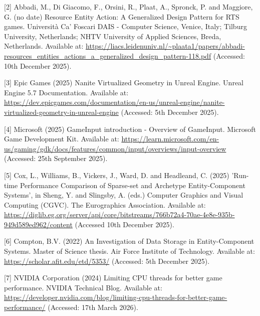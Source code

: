\documentclass[]{final_report}
\begin{document}
[2] Abbadi, M., Di Giacomo, F., Orsini, R., Plaat, A., Spronck, P. and Maggiore, G. (no date) Resource Entity Action: A Generalized Design Pattern for RTS games. Università Ca' Foscari DAIS - Computer Science, Venice, Italy; Tilburg University, Netherlands; NHTV University of Applied Sciences, Breda, Netherlands. Available at: \url{https://liacs.leidenuniv.nl/~plaata1/papers/abbadi-resources_entities_actions_a_generalized_design_pattern-118.pdf} (Accessed: 10th December 2025). \newline

[3] Epic Games (2025) Nanite Virtualized Geometry in Unreal Engine. Unreal Engine 5.7 Documentation. Available at: \url{https://dev.epicgames.com/documentation/en-us/unreal-engine/nanite-virtualized-geometry-in-unreal-engine} (Accessed: 5th December 2025). \newline

[4] Microsoft (2025) GameInput introduction - Overview of GameInput. Microsoft Game Development Kit. Available at: \url{https://learn.microsoft.com/en-us/gaming/gdk/docs/features/common/input/overviews/input-overview} (Accessed: 25th September 2025). \newline

[5] Cox, L., Williams, B., Vickers, J., Ward, D. and Headleand, C. (2025) 'Run-time Performance Comparison of Sparse-set and Archetype Entity-Component Systems', in Sheng, Y. and Slingsby, A. (eds.) Computer Graphics and Visual Computing (CGVC). The Eurographics Association. Available at: \url{https://diglib.eg.org/server/api/core/bitstreams/766b72a4-70ae-4e8e-935b-949d589ed962/content} (Accessed 10th December 2025). \newline

[6] Compton, B.V. (2022) An Investigation of Data Storage in Entity-Component Systems. Master of Science thesis. Air Force Institute of Technology. Available at: \url{https://scholar.afit.edu/etd/5353/} (Accessed: 5th December 2025). \newline

[7] NVIDIA Corporation (2024) Limiting CPU threads for better game performance. 
NVIDIA Technical Blog. Available at: 
\url{https://developer.nvidia.com/blog/limiting-cpu-threads-for-better-game-performance/} 
(Accessed: 17th March 2026). \newline
\end{document}
